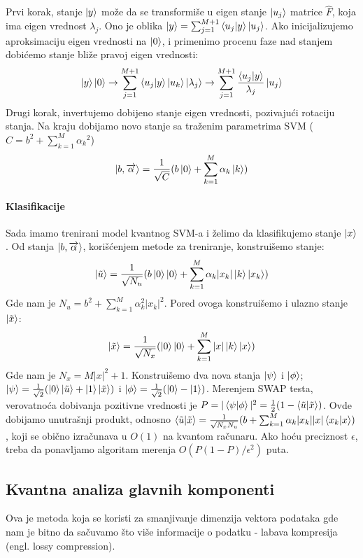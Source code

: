 \documentclass[12pt, letterpaper, oneside]{article}
\begin{document}
Prvi korak, stanje $\Ket{y}$ može da se transformiše u eigen stanje $\Ket{u_j}$ matrice $\hat{F}$, koja ima eigen vrednost $\lambda_j$.
Ono je oblika $\Ket{y} = \sum_{j=1}^{M+1}\braket{u_j|y}\Ket{u_j}$. Ako inicijalizujemo aproksimaciju eigen vrednosti na $\Ket{0}$, i primenimo 
procenu faze nad stanjem dobićemo stanje bliže pravoj eigen vrednosti:
\[
  \Ket{y}\Ket{0} \to \sum_{j=1}^{M+1}\braket{u_j|y}\Ket{u_k}\Ket{\lambda_j} \to \sum_{j=1}^{M+1}\frac{\braket{u_j|y}}{\lambda_j}\Ket{u_j}
\]
Drugi korak, invertujemo dobijeno stanje eigen vrednosti, pozivajući rotaciju stanja. Na kraju dobijamo novo stanje sa traženim parametrima SVM ($C = b^2 + \sum_{k=1}^M{\alpha_k}^2$)
\[
    \Ket{b,\overrightarrow{\alpha}} = \frac{1}{\sqrt{C}}(b\Ket{0}+ \sum_{k=1}^M{\alpha_k \Ket{k}})
\]

\paragraph*{Klasifikacije}
Sada imamo trenirani model kvantnog SVM-a i želimo da klasifikujemo stanje $\Ket{x}$. Od stanja $\Ket{b,\overrightarrow{\alpha}}$, korišćenjem metode za treniranje, konstruišemo stanje:
\[
    \Ket{\tilde{u}} = \frac{1}{\sqrt{N_u}}(b\Ket{0}\Ket{0} + \sum_{k=1}^M{\alpha_k |x_k| \Ket{k}\Ket{x_k}})
\]
Gde nam je $N_u=b^2+\sum_{k=1}^M{\alpha_k^2 |x_k|^2}$. Pored ovoga konstruišemo i ulazno stanje $\Ket{\tilde{x}}$:
\[
    \Ket{\tilde{x}} = \frac{1}{\sqrt{N_x}}(\Ket{0}\Ket{0} + \sum_{k=1}^M{|x|\Ket{k}\Ket{x}})
\]
Gde nam je $N_x=M|x|^2 + 1$. Konstruišemo dva nova stanja $\Ket{\psi}$ i $\Ket{\phi}$; $\Ket{\psi}=\frac{1}{\sqrt{2}}(\Ket{0}\Ket{\tilde{u}}+\Ket{1}\Ket{\tilde{x}})$ i
$\Ket{\phi} = \frac{1}{\sqrt{2}}(\Ket{0}-\Ket{1})$. Merenjem SWAP testa, verovatnoća dobivanja pozitivne vrednosti je $P=|\braket{\psi|\phi}|^2=\frac{1}{2}(1-\braket{\tilde{u}|\tilde{x}})$. 
Ovde dobijamo unutrašnji produkt, odnosno $\braket{\tilde{u}|\tilde{x}} = \frac{1}{\sqrt{N_xN_u}}(b+\sum_{k=1}^M{\alpha_k |x_k||x|\braket{x_k|x}})$, koji se obično izračunava u $O(1)$ na kvantom računaru.
Ako hoću preciznost $\epsilon$, treba da ponavljamo algoritam merenja $O(P(1-P)/\epsilon^2)$ puta. \cite{rebentrost2014quantum}

\subsection{Kvantna analiza glavnih komponenti}
Ova je metoda koja se koristi za smanjivanje dimenzija vektora podataka gde nam je bitno da sačuvamo što više informacije o podatku - labava kompresija (engl. lossy compression). 
\end{document}
